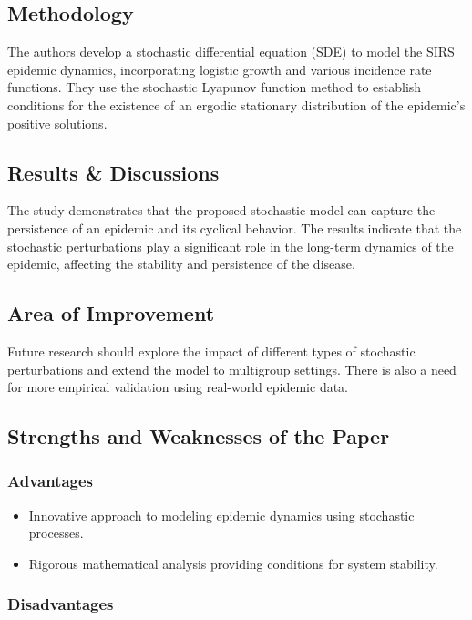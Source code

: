 \subsection{Methodology}

The authors develop a stochastic differential equation (SDE) to model the SIRS epidemic dynamics, incorporating logistic growth and various incidence rate functions. They use the stochastic Lyapunov function method to establish conditions for the existence of an ergodic stationary distribution of the epidemic's positive solutions.

\subsection{Results \& Discussions}

The study demonstrates that the proposed stochastic model can capture the persistence of an epidemic and its cyclical behavior. The results indicate that the stochastic perturbations play a significant role in the long-term dynamics of the epidemic, affecting the stability and persistence of the disease.

\subsection{Area of Improvement}

Future research should explore the impact of different types of stochastic perturbations and extend the model to multigroup settings. There is also a need for more empirical validation using real-world epidemic data.

\subsection{Strengths and Weaknesses of the Paper}

\subsubsection{Advantages}

\begin{itemize}
    \item Innovative approach to modeling epidemic dynamics using stochastic processes.
    \item Rigorous mathematical analysis providing conditions for system stability.
\end{itemize}

\subsubsection{Disadvantages}

